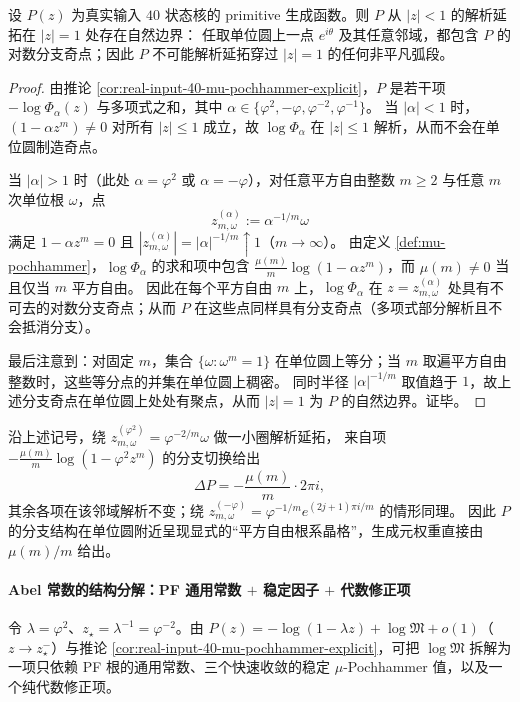 \begin{theorem}[单位圆自然边界]\label{thm:primitive-natural-boundary-unit-circle}
设 \(P(z)\) 为真实输入 \(40\) 状态核的 primitive 生成函数。则 \(P\) 从 \(|z|<1\) 的解析延拓在 \(|z|=1\) 处存在自然边界：
任取单位圆上一点 \(e^{i\theta}\) 及其任意邻域，都包含 \(P\) 的对数分支奇点；因此 \(P\) 不可能解析延拓穿过 \(|z|=1\) 的任何非平凡弧段。
\end{theorem}
\begin{proof}
由推论 \ref{cor:real-input-40-mu-pochhammer-explicit}，\(P\) 是若干项 \(-\log\Phi_\alpha(z)\) 与多项式之和，其中 \(\alpha\in\{\varphi^2,-\varphi,\varphi^{-2},\varphi^{-1}\}\)。
当 \(|\alpha|<1\) 时，\((1-\alpha z^m)\neq 0\) 对所有 \(|z|\le 1\) 成立，故 \(\log\Phi_\alpha\) 在 \(|z|\le 1\) 解析，从而不会在单位圆制造奇点。

当 \(|\alpha|>1\) 时（此处 \(\alpha=\varphi^2\) 或 \(\alpha=-\varphi\)），对任意平方自由整数 \(m\ge 2\) 与任意 \(m\) 次单位根 \(\omega\)，点
\[
z_{m,\omega}^{(\alpha)}:=\alpha^{-1/m}\omega
\]
满足 \(1-\alpha z^m=0\) 且 \(|z_{m,\omega}^{(\alpha)}|=|\alpha|^{-1/m}\uparrow 1\)（\(m\to\infty\)）。
由定义 \ref{def:mu-pochhammer}，\(\log\Phi_\alpha\) 的求和项中包含
\(\frac{\mu(m)}{m}\log(1-\alpha z^m)\)，而 \(\mu(m)\neq 0\) 当且仅当 \(m\) 平方自由。
因此在每个平方自由 \(m\) 上，\(\log\Phi_\alpha\) 在 \(z=z_{m,\omega}^{(\alpha)}\) 处具有不可去的对数分支奇点；从而 \(P\) 在这些点同样具有分支奇点（多项式部分解析且不会抵消分支）。

最后注意到：对固定 \(m\)，集合 \(\{\omega:\omega^m=1\}\) 在单位圆上等分；当 \(m\) 取遍平方自由整数时，这些等分点的并集在单位圆上稠密。
同时半径 \(|\alpha|^{-1/m}\) 取值趋于 \(1\)，故上述分支奇点在单位圆上处处有聚点，从而 \(|z|=1\) 为 \(P\) 的自然边界。证毕。
\end{proof}

\begin{remark}\label{rem:primitive-monodromy-mu}
沿上述记号，绕 \(z_{m,\omega}^{(\varphi^2)}=\varphi^{-2/m}\omega\) 做一小圈解析延拓，
来自项 \(-\frac{\mu(m)}{m}\log(1-\varphi^2 z^m)\) 的分支切换给出
\[
\Delta P=-\frac{\mu(m)}{m}\cdot 2\pi i,
\]
其余各项在该邻域解析不变；绕 \(z_{m,\omega}^{(-\varphi)}=\varphi^{-1/m}e^{(2j+1)\pi i/m}\) 的情形同理。
因此 \(P\) 的分支结构在单位圆附近呈现显式的“平方自由根系晶格”，生成元权重直接由 \(\mu(m)/m\) 给出。
\end{remark}

\paragraph{Abel 常数的结构分解：PF 通用常数 \texorpdfstring{$+$}{+} 稳定因子 \texorpdfstring{$+$}{+} 代数修正项}
令 \(\lambda=\varphi^2\)、\(z_\star=\lambda^{-1}=\varphi^{-2}\)。由 \(P(z)=-\log(1-\lambda z)+\log\mathfrak{M}+o(1)\)（\(z\to z_\star^{-}\)）与推论 \ref{cor:real-input-40-mu-pochhammer-explicit}，可把 \(\log\mathfrak M\) 拆解为一项只依赖 PF 根的通用常数、三个快速收敛的稳定 \(\mu\)-Pochhammer 值，以及一个纯代数修正项。

